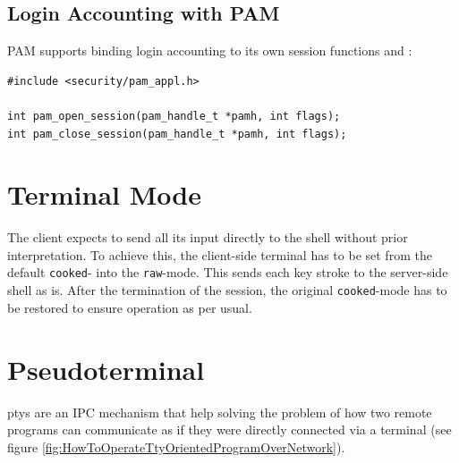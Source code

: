 \documentclass[10pt,a4paper,titlepage,twoside,english,final]{zhawreprt}
\begin{document}
\subsection{Login Accounting with PAM}\label{ssec:DesignLoginAccountingWithPAM}
\gls{PAM} supports binding login accounting to its own session functions \cite{pam_open_session} and \cite{pam_close_session}:
\setlistingC
\begin{lstlisting}[caption={\gls{PAM} session management},label=lst:PAMSessionManagement]
#include <security/pam_appl.h>

int pam_open_session(pam_handle_t *pamh, int flags);
int pam_close_session(pam_handle_t *pamh, int flags);
\end{lstlisting}

\section{Terminal Mode}\label{sec:DesignTerminalMode}
The client expects to send all its input directly to the \gls{shell} without prior interpretation. To achieve this, the client-side \gls{terminal} has to be set from the default \texttt{cooked}- into the \texttt{raw}-mode\citep[p.1309]{KerriskTLPI}. This sends each key stroke to the server-side \gls{shell} as is. After the termination of the session, the original \texttt{cooked}-mode has to be restored to ensure operation as per usual.

\section{Pseudoterminal}\label{sec:DesignPseudoterminal}
\glspl{pty} are an \gls{IPC} mechanism that help solving the problem of how two remote programs can communicate as if they were directly connected via a \gls{terminal} (see figure \ref{fig:HowToOperateTtyOrientedProgramOverNetwork}).
\end{document}
